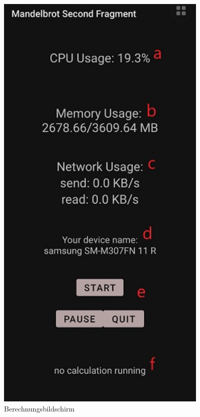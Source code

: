 \documentclass[12pt, onecolumn, notitlepage]{scrartcl}
\begin{document}
\begin{figure}[H]
\begin{minipage}[b]{.4\linewidth}
		\centering
		\includegraphics[height=0.5\textheight, width=0.9\textwidth]{calc_screen.jpg}
		\caption{Berechnungsbildschirm}
	\end{minipage}
\end{figure}
\end{document}
